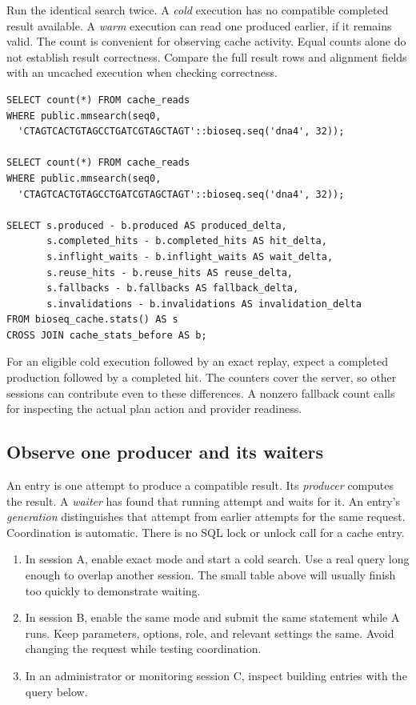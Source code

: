 Run the identical search twice. A \emph{cold} execution has no compatible
completed result available. A \emph{warm} execution can read one produced
earlier, if it remains valid.
The count is convenient for observing cache activity. Equal counts alone do
not establish result correctness. Compare the full result rows and alignment
fields with an uncached execution when checking correctness.

\par\noindent\begin{minipage}{\linewidth}
\begin{lstlisting}[style=bioseq-appendix-sql,
  caption={Repeat one exact request and inspect counter changes.}]
SELECT count(*) FROM cache_reads
WHERE public.mmsearch(seq0,
  'CTAGTCACTGTAGCCTGATCGTAGCTAGT'::bioseq.seq('dna4', 32));

SELECT count(*) FROM cache_reads
WHERE public.mmsearch(seq0,
  'CTAGTCACTGTAGCCTGATCGTAGCTAGT'::bioseq.seq('dna4', 32));

SELECT s.produced - b.produced AS produced_delta,
       s.completed_hits - b.completed_hits AS hit_delta,
       s.inflight_waits - b.inflight_waits AS wait_delta,
       s.reuse_hits - b.reuse_hits AS reuse_delta,
       s.fallbacks - b.fallbacks AS fallback_delta,
       s.invalidations - b.invalidations AS invalidation_delta
FROM bioseq_cache.stats() AS s
CROSS JOIN cache_stats_before AS b;
\end{lstlisting}
\end{minipage}

For an eligible cold execution followed by an exact replay, expect a completed
production followed by a completed hit. The counters cover the server, so other
sessions can contribute even to these differences. A nonzero fallback count
calls for inspecting the actual plan action and provider readiness.

\subsection{Observe one producer and its waiters}

An entry is one attempt to produce a compatible result. Its \emph{producer}
computes the result. A \emph{waiter} has found that running attempt and waits
for it. An entry's \emph{generation} distinguishes that attempt from earlier
attempts for the same request. Coordination is automatic. There is no SQL
lock or unlock call for a cache entry.
\begin{enumerate}
  \item In session A, enable exact mode and start a cold search. Use a real
    query long enough to overlap another session. The small table above will
    usually finish too quickly to demonstrate waiting.
  \item In session B, enable the same mode and submit the same statement
    while A runs. Keep parameters, options, role, and relevant settings the
    same. Avoid changing the request while testing coordination.
  \item In an administrator or monitoring session C, inspect building
    entries with the query below.
\end{enumerate}

